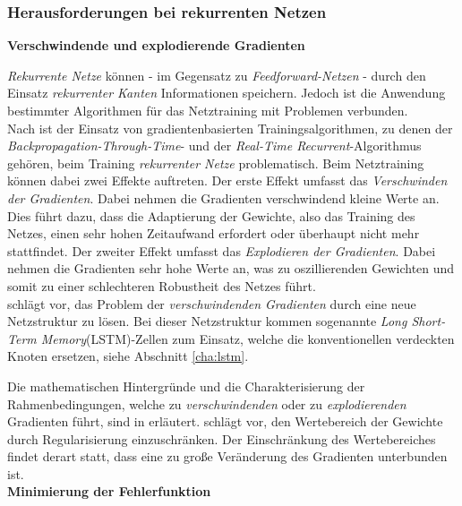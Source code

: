  
\subsubsection{Herausforderungen bei rekurrenten Netzen}
\label{cha_recurrent_problem}

\textbf{Verschwindende und explodierende Gradienten}

\textit{Rekurrente Netze} können - im Gegensatz zu \textit{Feedforward-Netzen} - durch den Einsatz \textit{rekurrenter Kanten} Informationen speichern. Jedoch ist die Anwendung bestimmter Algorithmen für das Netztraining mit Problemen verbunden. \\
Nach \cite{Hochreiter.2001} ist der Einsatz von gradientenbasierten Trainingsalgorithmen, zu denen der \textit{Backpropagation-Through-Time}- und der \textit{Real-Time Recurrent}-Algorithmus gehören, beim Training \textit{rekurrenter Netze} problematisch. Beim  Netztraining können dabei zwei Effekte auftreten. Der erste Effekt umfasst das \textit{Verschwinden der Gradienten}. Dabei nehmen die Gradienten verschwindend kleine Werte an. Dies führt dazu, dass die Adaptierung der Gewichte, also das Training des Netzes, einen sehr hohen Zeitaufwand erfordert oder überhaupt nicht mehr stattfindet. Der zweiter Effekt umfasst das \textit{Explodieren der Gradienten}. Dabei nehmen die Gradienten sehr hohe Werte an, was zu oszillierenden Gewichten und somit zu einer schlechteren Robustheit des Netzes führt. \cite{Hochreiter.2001} \\
\cite{Hochreiter.2001} schlägt vor, das Problem der \textit{verschwindenden Gradienten} durch eine neue Netzstruktur zu lösen. Bei dieser Netzstruktur kommen sogenannte \textit{Long Short-Term Memory}(LSTM)-Zellen zum Einsatz, welche die konventionellen verdeckten Knoten ersetzen, siehe Abschnitt \ref{cha:lstm}.

Die mathematischen Hintergründe und die Charakterisierung der Rahmenbedingungen, welche zu \textit{verschwindenden} oder zu \textit{explodierenden} Gradienten führt, sind in \cite{Pascanu.11212012} erläutert. \cite{Pascanu.11212012} schlägt vor, den Wertebereich der Gewichte durch Regularisierung einzuschränken. Der Einschränkung des Wertebereiches findet derart statt, dass eine zu große Veränderung des Gradienten unterbunden ist. \\


\textbf{Minimierung der Fehlerfunktion}

